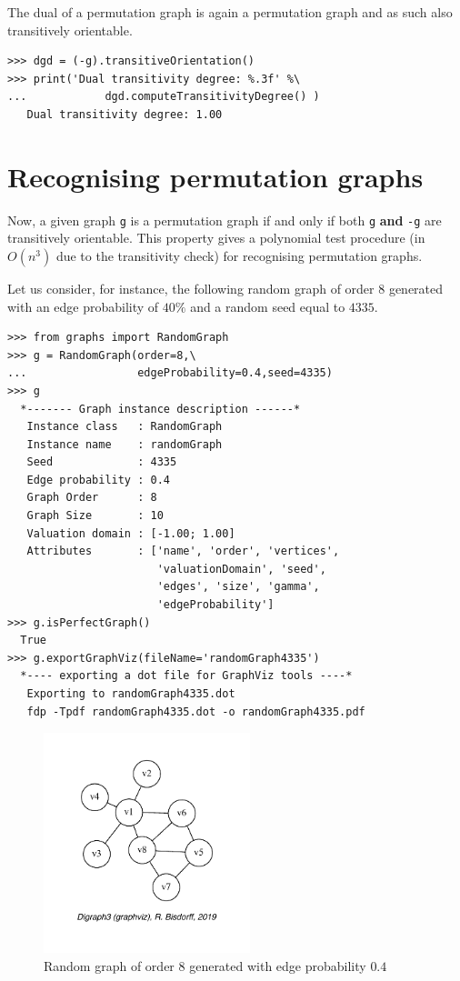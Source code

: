 The dual of a permutation graph is again a permutation graph and as such also transitively orientable.
\begin{lstlisting}
>>> dgd = (-g).transitiveOrientation()
>>> print('Dual transitivity degree: %.3f' %\
...            dgd.computeTransitivityDegree() )
   Dual transitivity degree: 1.00
\end{lstlisting}

\section{Recognising permutation graphs}
\label{sec:23.4}

Now, a given graph \texttt{g} is a permutation graph if and only if both \texttt{g} \textbf{and} \texttt{-g} are transitively orientable. This  property gives a polynomial test procedure (in $O(n^3)$ due to the transitivity check) for recognising permutation graphs.

Let us consider, for instance, the following random graph of order 8 generated with an edge probability of $40\%$ and a random seed equal to $4335$.
\begin{lstlisting}
>>> from graphs import RandomGraph
>>> g = RandomGraph(order=8,\
...                 edgeProbability=0.4,seed=4335)
>>> g
  *------- Graph instance description ------*
   Instance class   : RandomGraph
   Instance name    : randomGraph
   Seed             : 4335
   Edge probability : 0.4
   Graph Order      : 8
   Graph Size       : 10
   Valuation domain : [-1.00; 1.00]
   Attributes       : ['name', 'order', 'vertices',
                       'valuationDomain', 'seed',
                       'edges', 'size', 'gamma',
                       'edgeProbability']
>>> g.isPerfectGraph()
  True
>>> g.exportGraphViz(fileName='randomGraph4335')
  *---- exporting a dot file for GraphViz tools ----*
   Exporting to randomGraph4335.dot
   fdp -Tpdf randomGraph4335.dot -o randomGraph4335.pdf
\end{lstlisting}		    
\begin{figure}[ht]
\sidecaption[t]
\includegraphics[width=6cm]{Figures/23-8-randomGraph4335.pdf}
\caption{Random graph of order 8 generated with edge probability $0.4$} 
\label{fig:23.8}       %
\end{figure}

